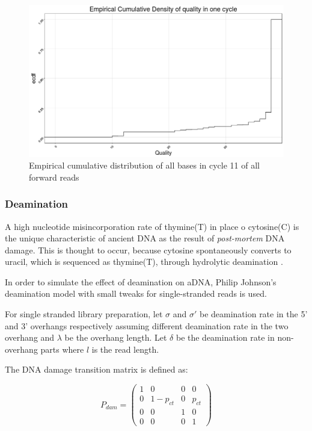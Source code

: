 \documentclass[11pt,a4paper]{report}
\begin{document}
\begin{figure}[H]
\centering
\includegraphics[width=12cm]{pictures/Rplot_ecdf.png}
\caption{Empirical cumulative distribution of all bases in cycle 11 of all forward 
reads}
\label{CDF}
\end{figure}


\subsubsection{Deamination} \label{Deamination}

A high nucleotide misincorporation rate of thymine(T) in place o
cytosine(C) is the unique characteristic of ancient DNA as the result of
\emph{post-mortem} DNA damage.  This is thought to occur, because
cytosine spontaneously converts to uracil, which is sequenced as
thymine(T), through hydrolytic deamination
\cite{mapdamage2}\cite{damagepattern}.

In order to simulate the effect of deamination on aDNA, 
Philip Johnson's deamination model\cite{mapdamage2}  
with small tweaks for single-stranded reads is used.

For single stranded library preparation,
let $\sigma$ and $\sigma'$ be deamination rate in the 5' 
and 3' overhangs respectively assuming different deamination rate 
in the two overhang and $\lambda$ be the overhang length. 
Let  $\delta$ be the deamination rate in non-overhang parts 
where $l$ is the read length.


The DNA damage transition matrix is defined as:

$$ P_{dam} = 
 \begin{pmatrix}
  1 & 0 & 0 & 0 \\
  0 & 1-p_{ct} & 0 & p_{ct} \\
  0  & 0  & 1 & 0  \\
  0 & 0 & 0 & 1 
 \end{pmatrix}$$
 
\end{document}
